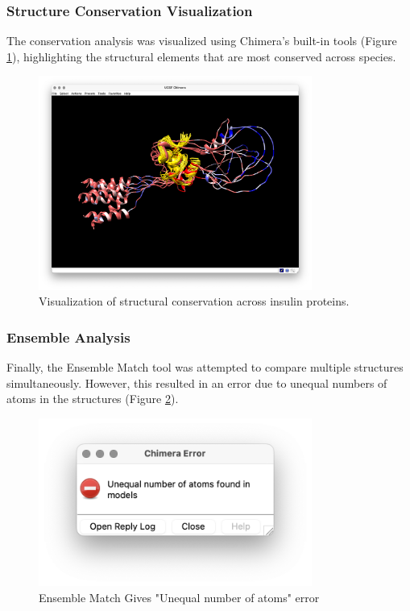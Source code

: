 \documentclass[11pt, a4paper, hidelinks]{article}
\begin{document}
\subsubsection{Structure Conservation Visualization}\label{subsubsec:conservation-vis}
The conservation analysis was visualized using Chimera's built-in tools (Figure \ref{fig:conservation-render}), highlighting the structural elements that are most conserved across species.

\begin{figure}[H]
    \centering
    \includegraphics[width=0.8\textwidth]{AAA59172.1/_img/conservation render}
    \caption{Visualization of structural conservation across insulin proteins.}
    \label{fig:conservation-render}
\end{figure}

\subsubsection{Ensemble Analysis}\label{subsubsec:ensemble}
Finally, the Ensemble Match tool was attempted to compare multiple structures simultaneously. However, this resulted in an error due to unequal numbers of atoms in the structures (Figure \ref{fig:ensemble-match}).

\begin{figure}[H]
    \centering
    \includegraphics[width=0.8\textwidth]{AAA59172.1/_img/ensemble match}
    \caption{Ensemble Match Gives "Unequal number of atoms" error}
    \label{fig:ensemble-match}
\end{figure}
\end{document}
